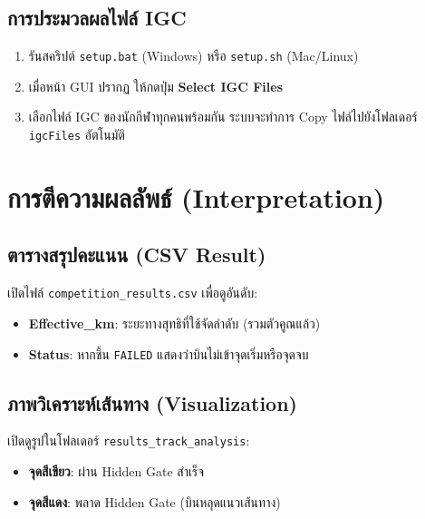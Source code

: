 \documentclass[14pt, a4paper]{extarticle} %
\begin{document}
\subsection{การประมวลผลไฟล์ IGC}
\begin{enumerate}
    \item รันสคริปต์ \texttt{setup.bat} (Windows) หรือ \texttt{setup.sh} (Mac/Linux)
    \item เมื่อหน้า GUI ปรากฏ ให้กดปุ่ม \textbf{Select IGC Files}
    \item เลือกไฟล์ IGC ของนักกีฬาทุกคนพร้อมกัน ระบบจะทำการ Copy ไฟล์ไปยังโฟลเดอร์ \texttt{igcFiles} อัตโนมัติ
\end{enumerate}

\section{การตีความผลลัพธ์ (Interpretation)}

\subsection{ตารางสรุปคะแนน (CSV Result)}
เปิดไฟล์ \texttt{competition\_results.csv} เพื่อดูอันดับ:
\begin{itemize}
    \item \textbf{Effective\_km}: ระยะทางสุทธิที่ใช้จัดลำดับ (รวมตัวคูณแล้ว)
    \item \textbf{Status}: หากขึ้น \texttt{FAILED} แสดงว่าบินไม่เข้าจุดเริ่มหรือจุดจบ
\end{itemize}

\subsection{ภาพวิเคราะห์เส้นทาง (Visualization)}
เปิดดูรูปในโฟลเดอร์ \texttt{results\_track\_analysis}:
\begin{itemize}
    \item \textbf{จุดสีเขียว}: ผ่าน Hidden Gate สำเร็จ
    \item \textbf{จุดสีแดง}: พลาด Hidden Gate (บินหลุดแนวเส้นทาง)
\end{itemize}
\end{document}
